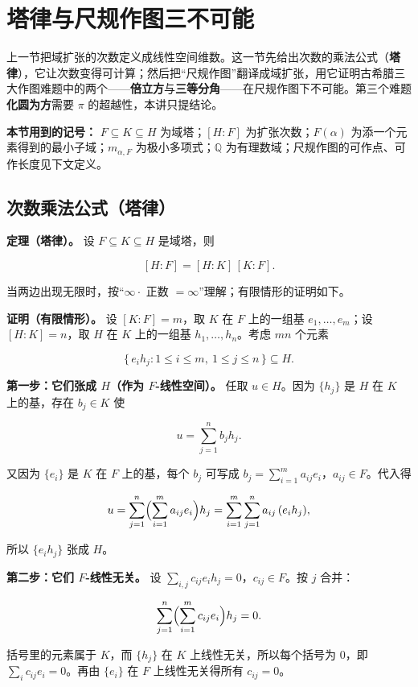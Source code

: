 \section{塔律与尺规作图三不可能}


上一节把域扩张的次数定义成线性空间维数。这一节先给出次数的乘法公式（\textbf{塔律}），它让次数变得可计算；然后把“尺规作图”翻译成域扩张，用它证明古希腊三大作图难题中的两个——\textbf{倍立方}与\textbf{三等分角}——在尺规作图下不可能。第三个难题\textbf{化圆为方}需要 $\pi$ 的超越性，本讲只提结论。

\textbf{本节用到的记号：} $F\subseteq K\subseteq H$ 为域塔；$[H:F]$ 为扩张次数；$F(\alpha)$ 为添一个元素得到的最小子域；$m_{\alpha,F}$ 为极小多项式；$\mathbb Q$ 为有理数域；尺规作图的可作点、可作长度见下文定义。

\subsection{次数乘法公式（塔律）}


\textbf{定理（塔律）。} 设 $F\subseteq K\subseteq H$ 是域塔，则

\[
[H:F]=[H:K]\,[K:F].
\]

当两边出现无限时，按“$\infty\cdot$ 正数 $=\infty$”理解；有限情形的证明如下。

\textbf{证明（有限情形）。} 设 $[K:F]=m$，取 $K$ 在 $F$ 上的一组基 $e_1,\dots,e_m$；设 $[H:K]=n$，取 $H$ 在 $K$ 上的一组基 $h_1,\dots,h_n$。考虑 $mn$ 个元素

\[
\{\,e_i h_j:1\le i\le m,\ 1\le j\le n\,\}\subseteq H.
\]

\textbf{第一步：它们张成 $H$（作为 $F$-线性空间）。} 任取 $u\in H$。因为 $\{h_j\}$ 是 $H$ 在 $K$ 上的基，存在 $b_j\in K$ 使

\[
u=\sum_{j=1}^{n} b_j h_j .
\]

又因为 $\{e_i\}$ 是 $K$ 在 $F$ 上的基，每个 $b_j$ 可写成 $b_j=\sum_{i=1}^{m}a_{ij}e_i$，$a_{ij}\in F$。代入得

\[
u=\sum_{j=1}^{n}\Bigl(\sum_{i=1}^{m}a_{ij}e_i\Bigr)h_j=\sum_{i=1}^{m}\sum_{j=1}^{n}a_{ij}\,(e_i h_j),
\]

所以 $\{e_ih_j\}$ 张成 $H$。

\textbf{第二步：它们 $F$-线性无关。} 设 $\sum_{i,j}c_{ij}e_ih_j=0$，$c_{ij}\in F$。按 $j$ 合并：

\[
\sum_{j=1}^{n}\Bigl(\sum_{i=1}^{m}c_{ij}e_i\Bigr)h_j=0.
\]

括号里的元素属于 $K$，而 $\{h_j\}$ 在 $K$ 上线性无关，所以每个括号为 $0$，即 $\sum_i c_{ij}e_i=0$。再由 $\{e_i\}$ 在 $F$ 上线性无关得所有 $c_{ij}=0$。

